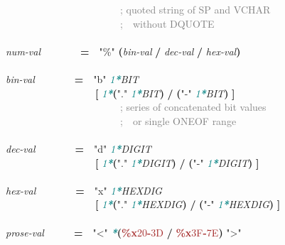 \documentclass{article}
\begin{document}
{\mbox{\ \ \ \ \ \ \ \ \ \ \ \ \ \ \ \ \ \ \ \ \ \ \ }\textcolor{gray}{; quoted string of SP and VCHAR}\\
\mbox{\ \ \ \ \ \ \ \ \ \ \ \ \ \ \ \ \ \ \ \ \ \ \ }\textcolor{gray}{;\mbox{\ \ }without DQUOTE}\\
\\
\emph{num{-}val}\mbox{\ \ \ \ \ \ \ \ }\textbf{=}\mbox{\ \ }\textcolor{BrickRed}{"{\%}"} \textbf{(}\emph{bin{-}val} \textbf{/} \emph{dec{-}val} \textbf{/} \emph{hex{-}val}\textbf{)}\\
\\
\emph{bin{-}val}\mbox{\ \ \ \ \ \ \ \ }\textbf{=}\mbox{\ \ }\textcolor{BrickRed}{"b"} \textcolor{teal}{\emph{1\textbf{*}}}\emph{BIT}\\
\mbox{\ \ \ \ \ \ \ \ \ \ \ \ \ \ \ \ \ \ }\textbf{[} \textcolor{teal}{\emph{1\textbf{*}}}\textbf{(}\textcolor{BrickRed}{"."} \textcolor{teal}{\emph{1\textbf{*}}}\emph{BIT}\textbf{)} \textbf{/} \textbf{(}\textcolor{BrickRed}{"{-}"} \textcolor{teal}{\emph{1\textbf{*}}}\emph{BIT}\textbf{)} \textbf{]}\\
\mbox{\ \ \ \ \ \ \ \ \ \ \ \ \ \ \ \ \ \ \ \ \ \ \ }\textcolor{gray}{; series of concatenated bit values}\\
\mbox{\ \ \ \ \ \ \ \ \ \ \ \ \ \ \ \ \ \ \ \ \ \ \ }\textcolor{gray}{;\mbox{\ \ }or single ONEOF range}\\
\\
\emph{dec{-}val}\mbox{\ \ \ \ \ \ \ \ }\textbf{=}\mbox{\ \ }\textcolor{BrickRed}{"d"} \textcolor{teal}{\emph{1\textbf{*}}}\emph{DIGIT}\\
\mbox{\ \ \ \ \ \ \ \ \ \ \ \ \ \ \ \ \ \ }\textbf{[} \textcolor{teal}{\emph{1\textbf{*}}}\textbf{(}\textcolor{BrickRed}{"."} \textcolor{teal}{\emph{1\textbf{*}}}\emph{DIGIT}\textbf{)} \textbf{/} \textbf{(}\textcolor{BrickRed}{"{-}"} \textcolor{teal}{\emph{1\textbf{*}}}\emph{DIGIT}\textbf{)} \textbf{]}\\
\\
\emph{hex{-}val}\mbox{\ \ \ \ \ \ \ \ }\textbf{=}\mbox{\ \ }\textcolor{BrickRed}{"x"} \textcolor{teal}{\emph{1\textbf{*}}}\emph{HEXDIG}\\
\mbox{\ \ \ \ \ \ \ \ \ \ \ \ \ \ \ \ \ \ }\textbf{[} \textcolor{teal}{\emph{1\textbf{*}}}\textbf{(}\textcolor{BrickRed}{"."} \textcolor{teal}{\emph{1\textbf{*}}}\emph{HEXDIG}\textbf{)} \textbf{/} \textbf{(}\textcolor{BrickRed}{"{-}"} \textcolor{teal}{\emph{1\textbf{*}}}\emph{HEXDIG}\textbf{)} \textbf{]}\\
\\
\emph{prose{-}val}\mbox{\ \ \ \ \ \ }\textbf{=}\mbox{\ \ }\textcolor{BrickRed}{"<"} \textcolor{teal}{\emph{\textbf{*}}}\textbf{(}\textcolor{Brown}{\textbf{\%{}x}20\textbf{-}3D} \textbf{/} \textcolor{Brown}{\textbf{\%{}x}3F\textbf{-}7E}\textbf{)} \textcolor{BrickRed}{">"}\\
}
\end{document}
